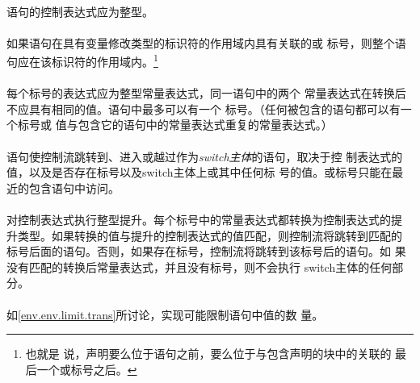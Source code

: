 {                                       
\constraint
\paragraph{}
语句的控制表达式应为整型。

\paragraph{}
如果语句在具有变量修改类型的标识符的作用域内具有关联的或
标号，则整个语句应在该标识符的作用域内。\footnote{也就是
说，声明要么位于语句之前，要么位于与包含声明的块中的关联的
最后一个或标号之后。}

\paragraph{}
每个标号的表达式应为整型常量表达式，同一语句中的两个
常量表达式在转换后不应具有相同的值。语句中最多可以有一个
标号。（任何被包含的语句都可以有一个标号或
值与包含它的语句中的常量表达式重复的常量表达式。）

\semantic
\paragraph{}
语句使控制流跳转到、进入或越过作为\textit{switch主体}的语句，取决于控
制表达式的值，以及是否存在标号以及switch主体上或其中任何标
号的值。或标号只能在最近的包含语句中访问。

\paragraph{}
对控制表达式执行整型提升。每个标号中的常量表达式都转换为控制表达式的提
升类型。如果转换的值与提升的控制表达式的值匹配，则控制流将跳转到匹配的
标号后面的语句。否则，如果存在标号，控制流将跳转到该标号后的语句。如
果没有匹配的转换后常量表达式，并且没有标号，则不会执行
switch主体的任何部分。

\implimit
\paragraph{}
如\ref{env.env.limit.trans}所讨论，实现可能限制语句中值的数
量。

}
